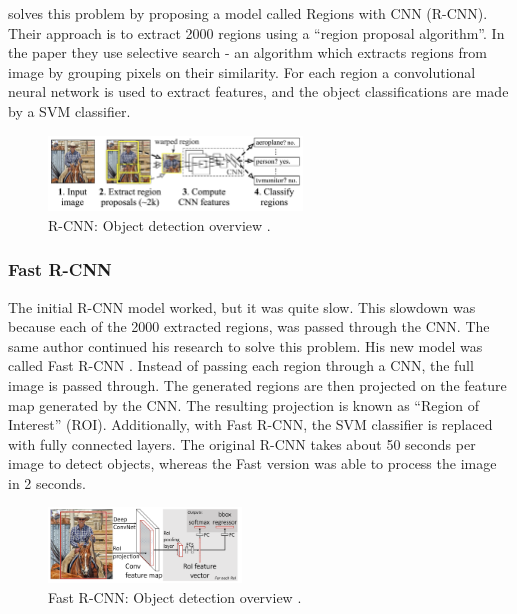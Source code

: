  solves this problem by proposing a model called Regions with CNN (R-CNN). Their approach is to extract 2000 regions using a ``region proposal algorithm''. In the paper they use selective search \cite{Uijlings2013} - an algorithm which extracts regions from image by grouping pixels on their similarity. For each region a convolutional neural network is used to extract features, and the object classifications are made by a SVM classifier.

\begin{figure}[ht]
\begin{center}
\includegraphics[height=2cm,keepaspectratio]{images/2_literature/r-cnn.png}
\end{center}
\caption{R-CNN: Object detection overview \cite{Girshick2013}.}
\end{figure}

\subsubsection{Fast R-CNN}
The initial R-CNN model worked, but it was quite slow. This slowdown was because each of the 2000 extracted regions, was passed through the CNN. The same author continued his research to solve this problem. His new model was called Fast R-CNN \cite{Girshick2015}. Instead of passing each region through a CNN, the full image is passed through. The generated regions are then projected on the feature map generated by the CNN. The resulting projection is known as ``Region of Interest'' (ROI). Additionally, with Fast R-CNN, the SVM classifier is replaced with fully connected layers. The original R-CNN takes about 50 seconds per image to detect objects, whereas the Fast version was able to process the image in 2 seconds.

\begin{figure}[ht]
\begin{center}
\includegraphics[height=2cm,keepaspectratio]{images/2_literature/fast-r-cnn.png}
\end{center}
\caption{Fast R-CNN: Object detection overview \cite{Girshick2015}.}
\end{figure}

